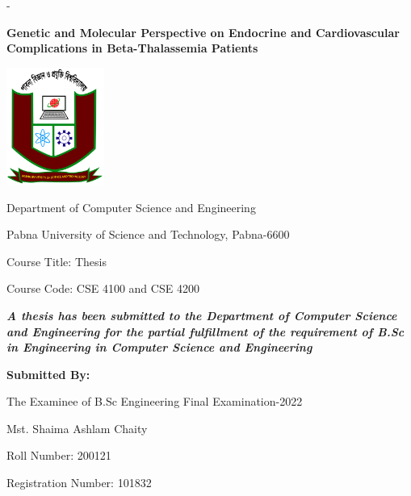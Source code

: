 \setlength{\parskip}{0pt}
%
\begin{titlingpage}
\begin{SingleSpace}
\calccentering{\unitlength} 
\begin{adjustwidth*}{\unitlength}{-\unitlength}

\begin{center}
    {\textbf{Genetic and Molecular Perspective on Endocrine and Cardiovascular Complications in Beta-Thalassemia Patients}}
\end{center}

\vspace{0.5cm}

\begin{center}
\includegraphics[width=32mm]{logos/pust_logo.jpg} %

Department of Computer Science and Engineering

Pabna University of Science and Technology, Pabna-6600

\vspace{0.5cm}

Course Title: Thesis

Course Code: CSE 4100 and CSE 4200


\vspace{0.5cm}

{\em \textbf{A thesis has been submitted to the Department of Computer Science and Engineering for the partial fulfillment of the requirement of B.Sc in Engineering in Computer Science and Engineering}
}

\vspace{1cm}
{\textbf {Submitted By:}}

The Examinee of B.Sc Engineering Final Examination-2022

Mst. Shaima Ashlam Chaity

Roll Number: 200121

Registration Number: 101832


\end{center}
\end{adjustwidth*}
\end{SingleSpace}
\end{titlingpage}
